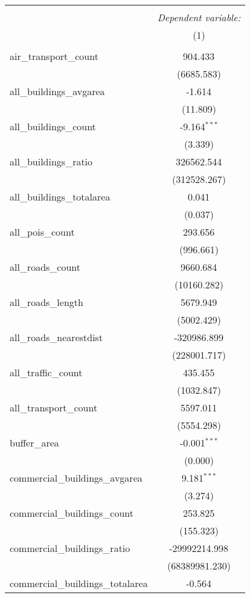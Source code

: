 \begin{table}[!htbp] \centering
\begin{tabular}{@{\extracolsep{5pt}}lc}
\\[-1.8ex]\hline
\hline \\[-1.8ex]
& \multicolumn{1}{c}{\textit{Dependent variable:}} \
\cr \cline{1-2}
\\[-1.8ex] & (1) \\
\hline \\[-1.8ex]
 air_transport_count & 904.433$^{}$ \\
  & (6685.583) \\
 all_buildings_avgarea & -1.614$^{}$ \\
  & (11.809) \\
 all_buildings_count & -9.164$^{***}$ \\
  & (3.339) \\
 all_buildings_ratio & 326562.544$^{}$ \\
  & (312528.267) \\
 all_buildings_totalarea & 0.041$^{}$ \\
  & (0.037) \\
 all_pois_count & 293.656$^{}$ \\
  & (996.661) \\
 all_roads_count & 9660.684$^{}$ \\
  & (10160.282) \\
 all_roads_length & 5679.949$^{}$ \\
  & (5002.429) \\
 all_roads_nearestdist & -320986.899$^{}$ \\
  & (228001.717) \\
 all_traffic_count & 435.455$^{}$ \\
  & (1032.847) \\
 all_transport_count & 5597.011$^{}$ \\
  & (5554.298) \\
 buffer_area & -0.001$^{***}$ \\
  & (0.000) \\
 commercial_buildings_avgarea & 9.181$^{***}$ \\
  & (3.274) \\
 commercial_buildings_count & 253.825$^{}$ \\
  & (155.323) \\
 commercial_buildings_ratio & -29992214.998$^{}$ \\
  & (68389981.230) \\
 commercial_buildings_totalarea & -0.564$^{}$ \\

\end{tabular}
\end{table}
